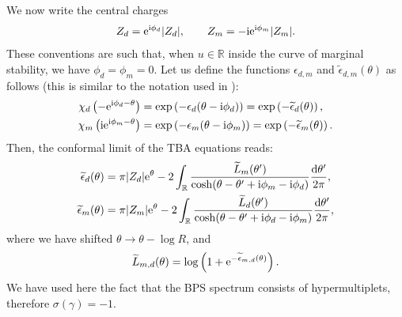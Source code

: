 \documentclass[a4paper,11pt]{article}
\theoremstyle{definition}
\def\IR{{\mathbb R}}
\newcommand{\re}{{\rm e}}
\newcommand{\ri}{{\rm i}}
\newcommand{\rd}{{\rm d}}
\newcommand{\ba}{\begin{aligned}}
\newcommand{\ea}{\end{aligned}}
\def\IR{\mathbb{R}}
\begin{document}
We now write the central charges
\begin{equation}
  Z_{d}=\re^{\ri \phi_d}|Z_d|, \qquad Z_m=-\ri \re^{\ri \phi_m} |Z_m|. 
\end{equation}
These conventions are such that, when $u \in \IR$ inside the curve of
marginal stability, we have $\phi_d=\phi_m=0$. Let us define the
functions $\epsilon_{d,m}$ and $\widetilde \epsilon_{d,m}(\theta)$ as
follows (this is similar to the notation used in \cite{amsv,ims}):
\begin{equation}
  \ba
  \chi_d\left( -\re^{\ri \phi_d -\theta}\right)&=
  \exp\left(-\epsilon_d (\theta-\ri \phi_d) \right)=
  \exp\left(-\widetilde \epsilon_d (\theta) \right),\\ 
  \chi_m\left( \ri \re^{\ri \phi_m -\theta}\right)&=
  \exp\left(-\epsilon_m (\theta-\ri \phi_m) \right)=
  \exp\left(-\widetilde \epsilon_m (\theta) \right).  
  \ea
\end{equation}
%
Then, the conformal limit of the TBA equations reads:
%
\begin{equation}\label{eq:cTBA-1}
  \ba
  \widetilde \epsilon_d(\theta)&=\pi |Z_d| \re^{\theta}-2 \int_\IR
  {\widetilde L_m(\theta') \over \cosh(\theta-\theta'+ \ri \phi_m-\ri
    \phi_d)} {\rd \theta' \over 2 \pi}, \\ 
  \widetilde \epsilon_m(\theta)&=\pi |Z_m| \re^{\theta}-2 \int_\IR
  {\widetilde L_d(\theta') \over \cosh(\theta-\theta'+ \ri \phi_d-\ri
    \phi_m)} {\rd \theta' \over 2 \pi},  
  \ea
\end{equation}
%
where we have shifted $\theta \to \theta -\log R$, and
%
\begin{equation}
  \widetilde L_{m,d}(\theta) = \log\left(1+\re^{-\widetilde
      \epsilon_{m,d}(\theta)} \right).  
\end{equation}
%
We have used here the fact that the BPS spectrum consists of
hypermultiplets, therefore $\sigma(\gamma)=-1$.
\end{document}
